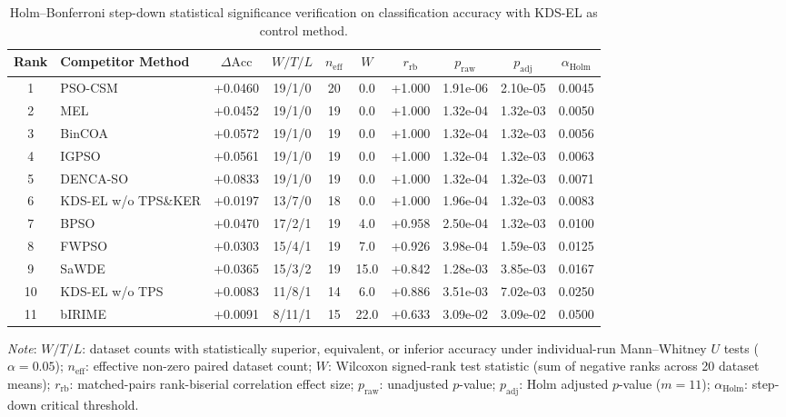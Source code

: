 \begin{table}[t]
\centering
\caption{Holm--Bonferroni step-down statistical significance verification on classification accuracy with KDS-EL as control method.}
\label{T6b}\label{tab:holm_bonferroni}
\small
\renewcommand{\arraystretch}{1.12}
\begin{tabular*}{\textwidth}{@{\extracolsep{\fill}}clcccccccc@{}}
\toprule
Rank & Competitor Method & $\Delta\mathrm{Acc}$ & $W/T/L$ & $n_{\mathrm{eff}}$ & $W$ & $r_{\mathrm{rb}}$ & $p_{\mathrm{raw}}$ & $p_{\mathrm{adj}}$ & $\alpha_{\mathrm{Holm}}$ \\
\midrule
   1 & PSO-CSM                & +0.0460 & 19/1/0 & 20 &    0.0 & +1.000 &   1.91e-06 &   2.10e-05 &   0.0045 \\
   2 & MEL                    & +0.0452 & 19/1/0 & 19 &    0.0 & +1.000 &   1.32e-04 &   1.32e-03 &   0.0050 \\
   3 & BinCOA                 & +0.0572 & 19/1/0 & 19 &    0.0 & +1.000 &   1.32e-04 &   1.32e-03 &   0.0056 \\
   4 & IGPSO                  & +0.0561 & 19/1/0 & 19 &    0.0 & +1.000 &   1.32e-04 &   1.32e-03 &   0.0063 \\
   5 & DENCA-SO               & +0.0833 & 19/1/0 & 19 &    0.0 & +1.000 &   1.32e-04 &   1.32e-03 &   0.0071 \\
   6 & KDS-EL w/o TPS\&KER    & +0.0197 & 13/7/0 & 18 &    0.0 & +1.000 &   1.96e-04 &   1.32e-03 &   0.0083 \\
   7 & BPSO                   & +0.0470 & 17/2/1 & 19 &    4.0 & +0.958 &   2.50e-04 &   1.32e-03 &   0.0100 \\
   8 & FWPSO                  & +0.0303 & 15/4/1 & 19 &    7.0 & +0.926 &   3.98e-04 &   1.59e-03 &   0.0125 \\
   9 & SaWDE                  & +0.0365 & 15/3/2 & 19 &   15.0 & +0.842 &   1.28e-03 &   3.85e-03 &   0.0167 \\
  10 & KDS-EL w/o TPS         & +0.0083 & 11/8/1 & 14 &    6.0 & +0.886 &   3.51e-03 &   7.02e-03 &   0.0250 \\
  11 & bIRIME                 & +0.0091 & 8/11/1 & 15 &   22.0 & +0.633 &   3.09e-02 &   3.09e-02 &   0.0500 \\
\bottomrule
\end{tabular*}
\vspace{2pt}
\par\raggedright\footnotesize
\textit{Note}: $W/T/L$: dataset counts with statistically superior, equivalent, or inferior accuracy under individual-run Mann--Whitney $U$ tests ($\alpha=0.05$); $n_{\mathrm{eff}}$: effective non-zero paired dataset count; $W$: Wilcoxon signed-rank test statistic (sum of negative ranks across 20 dataset means); $r_{\mathrm{rb}}$: matched-pairs rank-biserial correlation effect size; $p_{\mathrm{raw}}$: unadjusted $p$-value; $p_{\mathrm{adj}}$: Holm adjusted $p$-value ($m=11$); $\alpha_{\mathrm{Holm}}$: step-down critical threshold.
\end{table}